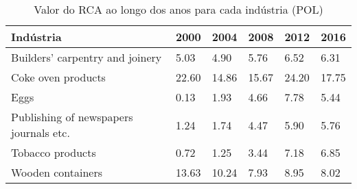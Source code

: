 \begin{table}
\centering
\caption{Valor do RCA ao longo dos anos para cada indústria (POL)}
\begin{tabular}{p{6cm}p{1.5cm}p{1.5cm}p{1.5cm}p{1.5cm}p{1.5cm}}
\toprule
                             Indústria &  2000 &  2004 &  2008 &  2012 &  2016 \\
\midrule
       Builders' carpentry and joinery &  5.03 &  4.90 &  5.76 &  6.52 &  6.31 \\
                    Coke oven products & 22.60 & 14.86 & 15.67 & 24.20 & 17.75 \\
                                  Eggs &  0.13 &  1.93 &  4.66 &  7.78 &  5.44 \\
Publishing of newspapers journals etc. &  1.24 &  1.74 &  4.47 &  5.90 &  5.76 \\
                      Tobacco products &  0.72 &  1.25 &  3.44 &  7.18 &  6.85 \\
                     Wooden containers & 13.63 & 10.24 &  7.93 &  8.95 &  8.02 \\
\bottomrule
\end{tabular}
\end{table}
